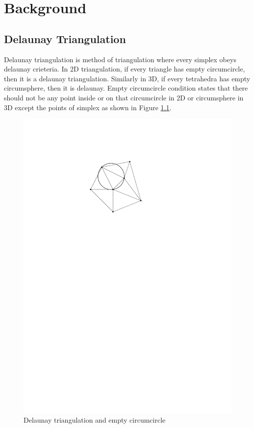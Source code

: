 \chapter{Background}
\section{Delaunay Triangulation}
Delaunay triangulation is method of triangulation where every simplex obeys delaunay crieteria. In 2D triangulation, if every triangle has empty circumcircle, then it is a delaunay triangulation. Similarly in 3D, if every tetrahedra has empty circumsphere, then it is delaunay. Empty circumcircle condition states that there should not be any point inside or on that circumcircle in 2D or circumsphere in 3D except the points of simplex as shown in Figure \ref{fig:del_tri}.

\begin{figure}[h]
	\centering
	\includegraphics{images/del_tri.pdf}
	\caption{Delaunay triangulation and empty circumcircle}
	\label{fig:del_tri}
\end{figure}

